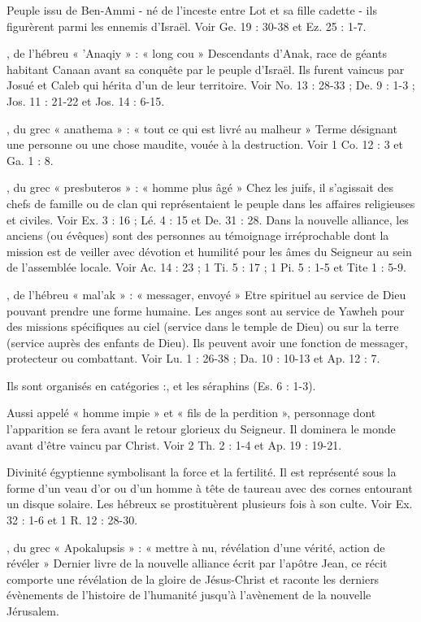 \begin{multicols}{2}
Peuple issu de Ben-Ammi - né de l’inceste entre Lot et sa fille cadette - ils figurèrent parmi les ennemis d'Israël. Voir Ge. 19 : 30-38 et Ez. 25 : 1-7.

, de l'hébreu « 'Anaqiy » : « long cou »
Descendants d'Anak, race de géants habitant Canaan avant sa conquête par le peuple d’Israël. Ils furent vaincus par Josué et Caleb qui hérita d’un de leur territoire. Voir No. 13 : 28-33 ; De. 9 : 1-3 ; Jos. 11 : 21-22 et Jos. 14 : 6-15.

, du grec « anathema » : « tout ce qui est livré au malheur »
Terme désignant une personne ou une chose maudite, vouée à la destruction. Voir 1 Co. 12 : 3 et Ga. 1 : 8.

, du grec « presbuteros » : « homme plus âgé »
Chez les juifs, il s’agissait des chefs de famille ou de clan qui représentaient le peuple dans les affaires religieuses et civiles. Voir Ex. 3 : 16 ; Lé. 4 : 15 et De. 31 : 28.
Dans la nouvelle alliance, les anciens (ou évêques) sont des personnes au témoignage irréprochable dont la mission est de veiller avec dévotion et humilité pour les âmes du Seigneur au sein de l’assemblée locale. Voir Ac. 14 : 23 ; 1 Ti. 5 : 17 ; 1 Pi. 5 : 1-5 et Tite 1 : 5-9.

, de l'hébreu « mal'ak » : « messager, envoyé »
Etre spirituel au service de Dieu pouvant prendre une forme humaine. Les anges sont au service de Yawheh pour des missions spécifiques au ciel (service dans le temple de Dieu) ou sur la terre (service auprès des enfants de Dieu). Ils peuvent avoir une fonction de messager, protecteur ou combattant. Voir Lu. 1 : 26-38 ; Da. 10 : 10-13 et Ap. 12 : 7.

Ils sont organisés en catégories :, et les séraphins (Es. 6 : 1-3).

Aussi appelé « homme impie » et « fils de la perdition », personnage dont l'apparition se fera avant le retour glorieux du Seigneur. Il dominera le monde avant d'être vaincu par Christ. Voir 2 Th. 2 : 1-4 et Ap. 19 : 19-21.

Divinité égyptienne symbolisant la force et la fertilité. Il est représenté sous la forme d'un veau d'or ou d'un homme à tête de taureau avec des cornes entourant un disque solaire. Les hébreux se prostituèrent plusieurs fois à son culte. Voir Ex. 32 : 1-6 et 1 R. 12 : 28-30.

, du grec « Apokalupsis » : « mettre à nu, révélation d'une vérité, action de révéler »
Dernier livre de la nouvelle alliance écrit par l’apôtre Jean, ce récit comporte une révélation de la gloire de Jésus-Christ et raconte les derniers évènements de l’histoire de l’humanité jusqu'à l'avènement de la nouvelle Jérusalem.


\end{multicols}
